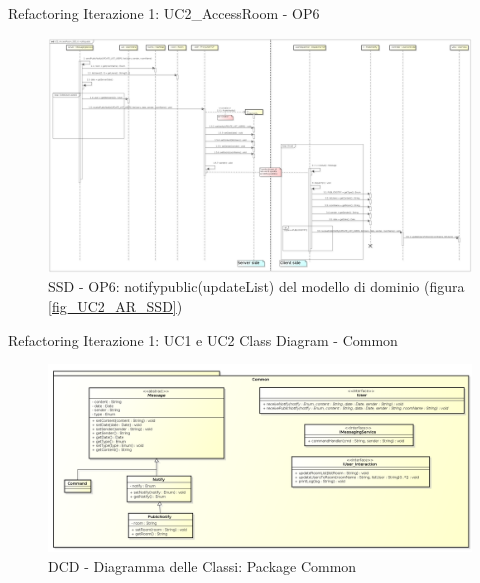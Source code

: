 \documentclass[t]{beamer} %
\begin{document}
\begin{frame} {Refactoring Iterazione 1: UC2\_AccessRoom - OP6}
   \begin{figure}
     \includegraphics[scale=0.125]{image_astah/Iteration_1_DesignModel_Refactored/UC2_AccessRoom_SSD_6_notifypublic.png}{\centering}
     \caption{SSD - OP6: notifypublic(updateList) del modello di dominio (figura \ref{fig_UC2_AR_SSD}) }
     \label{fig_UC2_SSDR_AC_6} 
   \end{figure}
\end{frame}

\begin{frame} {Refactoring Iterazione 1: UC1 e UC2 Class Diagram - Common}
   \begin{figure}
     \includegraphics[scale=0.23]{image_astah/Iteration_1_DesignModel_Refactored/ClassDiagramCommon.png}{\centering}
     \caption{DCD - Diagramma delle Classi: Package Common }
     \label{fig_UC1_UC2_DCDR_1} 
   \end{figure}
\end{frame}
\end{document}

